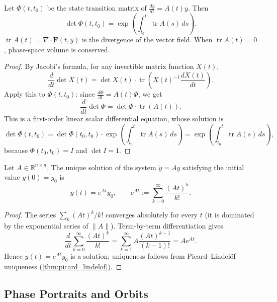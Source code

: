 \begin{proposition}\label{prop:liouville_formula}
Let $\Phi(t, t_0)$ be the state transition matrix of $\frac{dy}{dt} = A(t) y$. Then
\[
\det \Phi(t, t_0) = \exp\left( \int_{t_0}^t \operatorname{tr} A(s) \, ds \right).
\]
$\operatorname{tr} A(t) = \nabla \cdot \mathbf{F}(t, y)$ is the divergence of the vector field. When $\operatorname{tr} A(t) = 0$, phase-space volume is conserved.
\end{proposition}

\begin{proof}
By Jacobi's formula, for any invertible matrix function $X(t)$,
\[
\frac{d}{dt} \det X(t) = \det X(t) \cdot \operatorname{tr}\!\left( X(t)^{-1} \frac{dX(t)}{dt} \right).
\]
Apply this to $\Phi(t, t_0)$: since $\frac{d\Phi}{dt} = A(t)\Phi$, we get
\[
\frac{d}{dt} \det \Phi = \det \Phi \cdot \operatorname{tr}(A(t)).
\]
This is a first-order linear scalar differential equation, whose solution is
\[
\det \Phi(t, t_0) = \det \Phi(t_0, t_0) \cdot \exp\left( \int_{t_0}^t \operatorname{tr}A(s)\,ds \right) = \exp\left( \int_{t_0}^t \operatorname{tr}A(s)\,ds \right),
\]
because $\Phi(t_0, t_0) = I$ and $\det I = 1$.
\end{proof}

\begin{theorem}\label{thm:constant_coefficient_exponential}
Let $A \in \mathbb{R}^{n \times n}$. The unique solution of the system $\dot{y} = A y$ satisfying the initial value $y(0) = y_0$ is
\[
y(t) = e^{At} y_0, \qquad e^{At} := \sum_{k=0}^{\infty} \frac{(At)^k}{k!}.
\]
\end{theorem}

\begin{proof}
The series $\sum_k (At)^k/k!$ converges absolutely for every $t$ (it is dominated by the exponential series of $\|A\|$). Term-by-term differentiation gives
\[
\frac{d}{dt}\sum_{k=0}^{\infty}\frac{(At)^k}{k!} = \sum_{k=1}^{\infty} A \frac{(At)^{k-1}}{(k-1)!} = A e^{At}.
\]
Hence $y(t) = e^{At}y_0$ is a solution; uniqueness follows from Picard--Lindelöf uniqueness (\cref{thm:picard_lindelof}).
\end{proof}

\subsection{Phase Portraits and Orbits}\label{sec:ode_phase}

